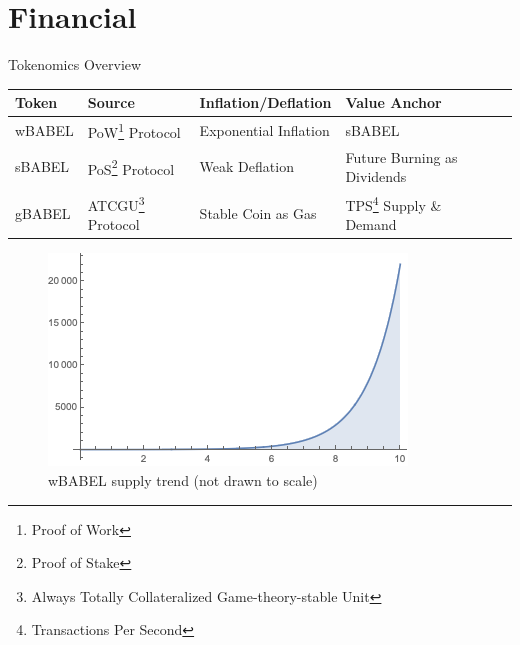 \documentclass{beamer}
\begin{document}
\section{Financial}

\begin{frame}{Tokenomics Overview}
\begin{table}
\begin{footnotesize}
\begin{tabular}{l l l ll}
\hline

\textbf{Token} & \textbf{Source} & \textbf{Inflation/Deflation} & \textbf{Value Anchor} \\
\hline
wBABEL & PoW\footnote{{\tiny Proof of Work}} Protocol & Exponential Inflation & sBABEL  \\
sBABEL & PoS\footnote{{\tiny Proof of Stake}} Protocol & Weak Deflation & Future Burning as Dividends \\
gBABEL & ATCGU\footnote{{\tiny Always Totally Collateralized Game-theory-stable Unit}} Protocol & Stable Coin as Gas & TPS\footnote{{\tiny Transactions Per Second}} Supply \& Demand \\
\hline
\end{tabular}
\end{footnotesize}
\end{table}
	\begin{figure}
\hfill
        \begin{minipage}{.25\textwidth}
            \centering
            \includegraphics[width=\linewidth]{images/Fig1.png}
            \caption{{\scriptsize wBABEL supply trend (not drawn to scale)}}
        \end{minipage}%
\hfill
        \begin{minipage}{.25\textwidth}
            \centering

\end{minipage}
\end{figure}
\end{frame}
\end{document}
